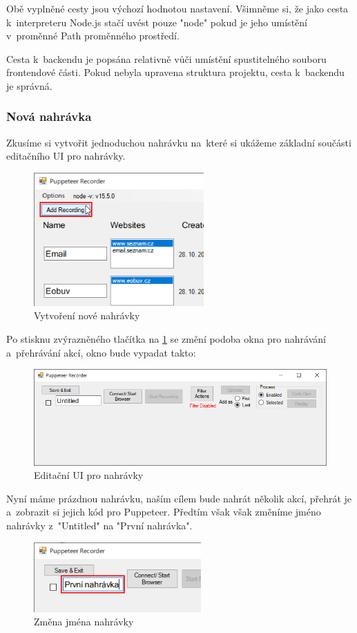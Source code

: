 \documentclass[12pt, a4paper, twoside]{article}
\begin{document}
	Obě vyplněné cesty jsou výchozí hodnotou nastavení. Všimněme si, že jako cesta k~interpreteru Node.js stačí uvést pouze "node" pokud je jeho umístění v~proměnné Path proměnného prostředí. 
	
	Cesta k~backendu je popsána relativně vůči umístění spustitelného souboru frontendové části. Pokud nebyla upravena struktura projektu, cesta k~backendu je správná.
	\subsubsection{Nová nahrávka}
	Zkusíme si vytvořit jednoduchou nahrávku na~které si ukážeme základní součásti editačního UI pro nahrávky. 
	\begin{figure}[H]
		\centering
		\includegraphics[width=0.58\textwidth]{addNewRecording.png}
		\caption{Vytvoření nové nahrávky}
		\label{fig:addNewRecording}
	\end{figure}
	\newpage
	Po stisknu zvýrazněného tlačítka na \cref{fig:addNewRecording} se změní podoba okna pro nahrávání a~přehrávání akcí, okno bude vypadat takto:
	\begin{figure}[H]
		\centering
		\includegraphics[width=1.0\textwidth]{emptyRecordingEdit.png}
		\caption{Editační UI pro nahrávky}
	\end{figure}
	Nyní máme prázdnou nahrávku, naším cílem bude nahrát několik akcí, přehrát je a~zobrazit si jejich kód pro Puppeteer. Předtím však však změníme jméno nahrávky z~"Untitled" na "První nahrávka".
	\begin{figure}[H]
		\centering
		\includegraphics[width=0.57\textwidth]{recordingNameChange.png}
		\caption{Změna jména nahrávky}
	\end{figure}
\end{document}
